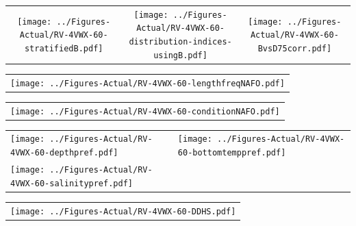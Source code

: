 \documentclass[12pt]{article}\usepackage[]{graphicx}\usepackage[]{color}
\begin{document}
\vspace{1cm}
\begin{minipage}{1.0\textwidth}
 \begin{tabular}{ccc}
\texttt{[image: ../Figures-Actual/RV-4VWX-60-stratifiedB.pdf]} & 
\texttt{[image: ../Figures-Actual/RV-4VWX-60-distribution-indices-usingB.pdf]} & 
\texttt{[image: ../Figures-Actual/RV-4VWX-60-BvsD75corr.pdf]} \\ 
\end{tabular} 
\end{minipage}
\clearpage
\begin{minipage}{1.0\textwidth}
 \begin{tabular}{c}
\texttt{[image: ../Figures-Actual/RV-4VWX-60-lengthfreqNAFO.pdf]} \\ 
\end{tabular} 
\end{minipage}
\newline

\vspace{1cm}
\begin{minipage}{1.0\textwidth}
 \begin{tabular}{c}
\texttt{[image: ../Figures-Actual/RV-4VWX-60-conditionNAFO.pdf]} \\ 
\end{tabular} 
\end{minipage}
\clearpage
\begin{minipage}{1.0\textwidth}
 \begin{tabular}[t]{m{3in}m{3in}}
\texttt{[image: ../Figures-Actual/RV-4VWX-60-depthpref.pdf]} & 
\texttt{[image: ../Figures-Actual/RV-4VWX-60-bottomtemppref.pdf]} \\ 
\texttt{[image: ../Figures-Actual/RV-4VWX-60-salinitypref.pdf]} & 
 \\ 
\end{tabular} 
\end{minipage}
\newline

\vspace{1cm}
\begin{minipage}{1.0\textwidth}
 \begin{tabular}{c}
\texttt{[image: ../Figures-Actual/RV-4VWX-60-DDHS.pdf]} \\ 
\end{tabular} 
\end{minipage}
\clearpage
\end{document}
